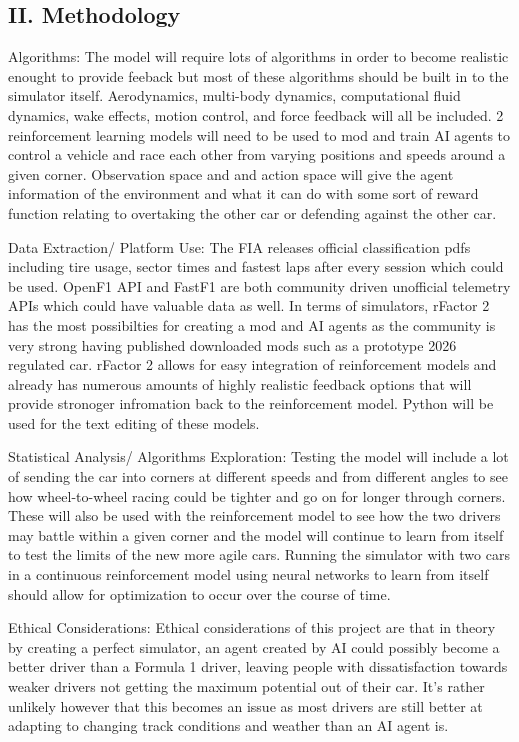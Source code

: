 \documentclass[11pt]{article} %
\begin{document}
\subsection{II. Methodology}

Algorithms: The model will require lots of algorithms in order to become realistic enought to provide feeback but most of these algorithms should be built in to the simulator itself. Aerodynamics, multi-body dynamics, computational fluid dynamics, wake effects, motion control, and force feedback will all be included. 2 reinforcement learning models will need to be used to mod and train AI agents to control a vehicle and race each other from varying positions and speeds around a given corner. Observation space and and action space will give the agent information of the environment and what it can do with some sort of reward function relating to overtaking the other car or defending against the other car.

Data Extraction/ Platform Use: The FIA releases official classification pdfs including tire usage, sector times and fastest laps after every session which could be used. OpenF1 API and FastF1 are both community driven unofficial telemetry APIs which could have valuable data as well. In terms of simulators, rFactor 2 has the most possibilties for creating a mod and AI agents as the community is very strong having published downloaded mods such as a prototype 2026 regulated car. rFactor 2 allows for easy integration of reinforcement models and already has numerous amounts of highly realistic feedback options that will provide stronoger infromation back to the reinforcement model.  Python will be used for the text editing of these models.

Statistical Analysis/ Algorithms Exploration: Testing the model will include a lot of sending the car into corners at different speeds and from different angles to see how wheel-to-wheel racing could be tighter and go on for longer through corners. These will also be used with the reinforcement model to see how the two drivers may battle within a given corner and the model will continue to learn from itself to test the limits of the new more agile cars. Running the simulator with two cars in a continuous reinforcement model using neural networks to learn from itself should allow for optimization to occur over the course of time. 

Ethical Considerations: Ethical considerations of this project are that in theory by creating a perfect simulator, an agent created by AI could possibly become a better driver than a Formula 1 driver, leaving people with dissatisfaction towards weaker drivers not getting the maximum potential out of their car. It's rather unlikely however that this becomes an issue as most drivers are still better at adapting to changing track conditions and weather than an AI agent is.
\end{document}
